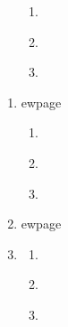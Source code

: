 \documentclass[12pt]{article}
\begin{document}
\begin{enumerate}
\begin{enumerate}
      \item \textit{}



      \item \textit{}



    \end{enumerate}


    
ewpage
    \item \textit{}    
    
    \begin{enumerate}
      \item \textit{}



      \item \textit{}



      \item \textit{}



    \end{enumerate}
 
    
    
ewpage
    \item \textit{}    
    
    \begin{enumerate}
      \item \textit{}



      \item \textit{}



      \item \textit{}



    \end{enumerate}    
    
    
    
ewpage
    \item \textit{}    
    
    \begin{enumerate}
      \item \textit{}



      \item \textit{}



      \item \textit{}




\end{enumerate}
\end{enumerate}
\end{document}
